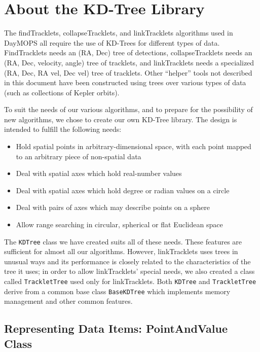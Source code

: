 \appendix
\section{About the KD-Tree Library}
\label{kdTreeLib}

The findTracklets, collapseTracklets, and linkTracklets algorithms
used in DayMOPS all require the use of KD-Trees for different types of
data.  FindTracklets needs an (RA, Dec) tree of detections,
collapseTracklets needs an (RA, Dec, velocity, angle) tree of
tracklets, and linkTracklets needs a specialized (RA, Dec, RA vel,
Dec vel) tree of tracklets.  Other ``helper'' tools not described in
this document have been constructed using trees over various types of
data (such as collections of Kepler orbits).

To suit the needs of our various algorithms, and to prepare for the
possibility of new algorithms, we chose to create our own KD-Tree
library.  The design is intended to fulfill the following needs:

\begin{itemize}
\item Hold spatial points in arbitrary-dimensional space, with each point mapped to an arbitrary piece of non-spatial data
\item Deal with spatial axes which hold real-number values
\item Deal with spatial axes which hold degree or radian values on a circle
\item Deal with pairs of axes which may describe points on a sphere
\item Allow range searching in circular, spherical or flat Euclidean space
\end{itemize}

The {\tt KDTree} class we have created suits all of these needs.
These features are sufficient for almost all our algorithms.  However,
linkTracklets uses trees in unusual ways and its performance is
closely related to the characteristics of the tree it uses; in order
to allow linkTracklets' special needs, we also created a class called
{\tt TrackletTree} used only for linkTracklets.  Both {\tt KDTree} and
{\tt TrackletTree} derive from a common base class {\tt BaseKDTree}
which implements memory management and other common features.

\subsection{Representing Data Items: PointAndValue Class}

